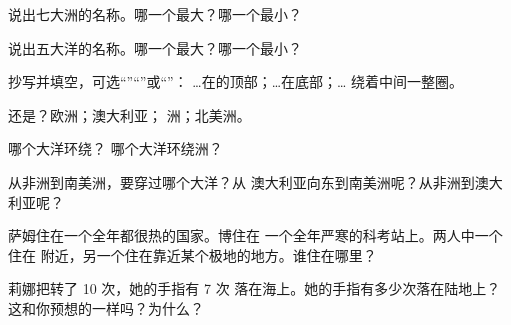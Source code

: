 \begin{exercise}[$\star$]\label{exo:g3:continents-and-oceans:1}
说出七大洲的名称。哪一个最大？哪一个最小？
\end{exercise}

\begin{exercise}[$\star$]\label{exo:g3:continents-and-oceans:2}
说出五大洋的名称。哪一个最大？哪一个最小？
\end{exercise}

\begin{exercise}[$\star$]\label{exo:g3:continents-and-oceans:3}
抄写并填空，可选“”“”或“”：
\dots{}在的顶部；\dots{}在底部；\dots{}
绕着中间一整圈。
\end{exercise}

\begin{exercise}[$\star$]\label{exo:g3:continents-and-oceans:4}
还是？欧洲；澳大利亚；
洲；北美洲。
\end{exercise}

\begin{exercise}[$\star$]\label{exo:g3:continents-and-oceans:5}
哪个大洋环绕？
哪个大洋环绕洲？
\end{exercise}

\begin{exercise}[$\star\star$]\label{exo:g3:continents-and-oceans:6}
从非洲到南美洲，要穿过哪个大洋？从
澳大利亚向东到南美洲呢？从非洲到澳大利亚呢？
\end{exercise}

\begin{exercise}[$\star\star$]\label{exo:g3:continents-and-oceans:7}
萨姆住在一个全年都很热的国家。博住在
一个全年严寒的科考站上。两人中一个住在
附近，另一个住在靠近某个极地的地方。谁住在哪里？
\end{exercise}

\begin{exercise}[$\star\star$]\label{exo:g3:continents-and-oceans:8}
莉娜把转了 10 次，她的手指有 7 次
落在海上。她的手指有多少次落在陆地上？这和你预想的一样吗？为什么？
\end{exercise}

